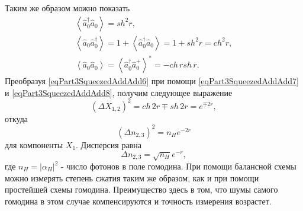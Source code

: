 Таким же образом можно показать
\begin{eqnarray}
\left<\hat{a}_0^{\dag}\hat{a}_0\right> = sh^2 r,
\nonumber \\
\left<\hat{a}_0\hat{a}_0^{\dag}\right> = 
1 + \left<\hat{a}_0^{\dag}\hat{a}_0\right> =
1 + sh^2 r = ch^2 r,
\nonumber \\
\left<\hat{a}_0\hat{a}_0\right> = 
\left<\hat{a}_0^{\dag}\hat{a}_0^{+}\right>^{*} = - ch\,r sh\,r.
\label{eqPart3SqueezedAddAdd8}
\end{eqnarray}
Преобразуя \eqref{eqPart3SqueezedAddAdd6} при помощи
\eqref{eqPart3SqueezedAddAdd7} 
и
\eqref{eqPart3SqueezedAddAdd8},
получим следующее выражение
\begin{equation}
\left(\Delta X_{1,2}\right)^2 = 
ch\,2 r \mp sh\, 2 r = 
e^{\mp 2 r},
\nonumber
\end{equation}
откуда
\begin{equation}
\left(\Delta n_{2,3}\right)^2 = 
n_H
e^{- 2 r}
\nonumber
\end{equation}
для компоненты $X_1$. Дисперсия равна 
\[
\Delta n_{2,3} = 
\sqrt{n_H}
e^{- r},
\]
где $n_H=\left|\alpha_H\right|^2$ - число фотонов в поле гомодина.
При помощи балансной схемы можно измерять степень сжатия таким же
образом, как и при помощи простейшей схемы гомодина. Преимущество
здесь в том, что шумы самого гомодина в этом случае компенсируются и
точность измерения возрастет.


